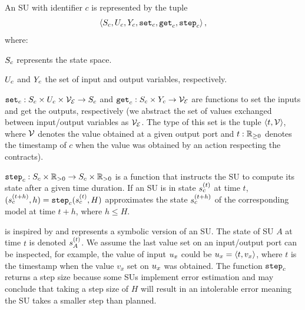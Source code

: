 \begin{definition}\label{def:fmu}
  An SU with identifier $c$ is represented by the tuple
  $$ \left\langle S_{c}, U_{c}, Y_{c}, \mathtt{set}_{c}, \mathtt{get}_{c}, \mathtt{step}_{c} \right\rangle ,$$
  where:
  \begin{compactitem}
    \item $S_{c}$ represents the state space.
    \item $U_{c}$ and $Y_{c}$ the set of input and output variables, respectively. 
    \item $\mathtt{set}_{c} : S_{c} \times U_{c} \times \mathcal{V_{E}} \to S_{c}$ and $\mathtt{get}_{c}: S_{c} \times Y_{c} \to \mathcal{V_{E}}$ are functions to set the inputs and get the outputs, respectively (we abstract the set of values exchanged between input/output variables as $\mathcal{V_{E}}$. The type of this set is the tuple $ \left\langle t, \mathcal{V} \right\rangle $, where $\mathcal{V}$ denotes the value obtained at a given output port and $t: \mathbb{R}_{\geq 0}$ denotes the timestamp of $c$ when the value was obtained by an action respecting the contracts).
    \item $\mathtt{step}_{c}: S_{c} \times \mathbb{R}_{> 0} \to S_{c} \times \mathbb{R}_{> 0} $ is a function that instructs the SU to compute its state after a given time duration. If an SU is in state $s_{c}^{(t)}$ at time $t$, $(s_{c}^{(t+h)}, h) = \mathtt{step}_{c}(s_{c}^{(t)}, H)$ approximates the state $s_{c}^{(t+h)}$ of the corresponding model at time $t+h$, where $h \leq H$. 
  \end{compactitem}
\end{definition}
\vspace{-0.5em}
 is inspired by \cite{Broman2013,Gomes2019c} and represents a symbolic version of an SU. 
The state of SU $A$ at time $t$ is denoted $s_{A}^{(t)}$.
We assume the last value set on an input/output port can be inspected, for example, the value of input $u_{x}$ could be $u_{x} =  \left\langle t, v_x \right\rangle $, where $t$ is the timestamp when the value $v_x$ set on $u_{x}$ was obtained.
The function $\mathtt{step}_{c}$ returns a step size because some SUs implement error estimation and may conclude that taking a step size of $H$ will result in an intolerable error meaning the SU takes a smaller step than planned.

